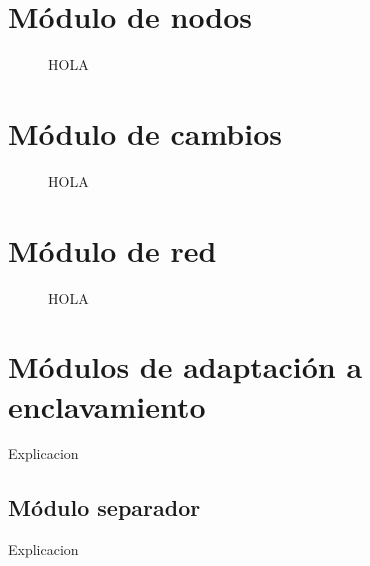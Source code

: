 \section{Módulo de nodos}

	\begin{figure}[h]
	\centering
		\caption{HOLA}
		\label{fig:hola}
	\end{figure}
	
\section{Módulo de cambios}

	\begin{figure}[h]
	\centering
		\caption{HOLA}
		\label{fig:hola}
	\end{figure}
	
\section{Módulo de red}

	\begin{figure}[h]
	\centering
		\caption{HOLA}
		\label{fig:hola}
	\end{figure}
	
\section{Módulos de adaptación a enclavamiento}

	Explicacion 
	 
	\subsection{Módulo separador}
		Explicacion 
		
